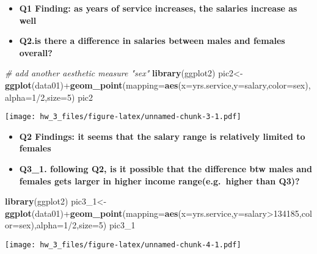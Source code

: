\documentclass[]{article}
\newenvironment{Shaded}{\begin{snugshade}}{\end{snugshade}}
\newcommand{\KeywordTok}[1]{\textcolor[rgb]{0.13,0.29,0.53}{\textbf{{#1}}}}
\newcommand{\DataTypeTok}[1]{\textcolor[rgb]{0.13,0.29,0.53}{{#1}}}
\newcommand{\DecValTok}[1]{\textcolor[rgb]{0.00,0.00,0.81}{{#1}}}
\newcommand{\CommentTok}[1]{\textcolor[rgb]{0.56,0.35,0.01}{\textit{{#1}}}}
\newcommand{\NormalTok}[1]{{#1}}
\begin{document}
\begin{itemize}
\item
  \textbf{Q1 Finding: as years of service increases, the salaries
  increase as well}
\item
  \textbf{Q2.is there a difference in salaries between males and females
  overall?}
\end{itemize}

\begin{Shaded}
\begin{Highlighting}[]
\CommentTok{# add another aesthetic measure "sex"}
\KeywordTok{library}\NormalTok{(ggplot2)}
\NormalTok{pic2<-}\KeywordTok{ggplot}\NormalTok{(data01)+}\KeywordTok{geom_point}\NormalTok{(}\DataTypeTok{mapping=}\KeywordTok{aes}\NormalTok{(}\DataTypeTok{x=}\NormalTok{yrs.service,}\DataTypeTok{y=}\NormalTok{salary,}\DataTypeTok{color=}\NormalTok{sex),}\DataTypeTok{alpha=}\DecValTok{1}\NormalTok{/}\DecValTok{2}\NormalTok{,}\DataTypeTok{size=}\DecValTok{5}\NormalTok{)}
\NormalTok{pic2}
\end{Highlighting}
\end{Shaded}

\texttt{[image: hw\_3\_files/figure-latex/unnamed-chunk-3-1.pdf]}

\begin{itemize}
\item
  \textbf{Q2 Findings: it seems that the salary range is relatively
  limited to females}
\item
  \textbf{Q3\_1. following Q2, is it possible that the difference btw
  males and females gets larger in higher income range(e.g.~higher than
  Q3)?}
\end{itemize}

\begin{Shaded}
\begin{Highlighting}[]
\KeywordTok{library}\NormalTok{(ggplot2)}
\NormalTok{pic3_1<-}\KeywordTok{ggplot}\NormalTok{(data01)+}\KeywordTok{geom_point}\NormalTok{(}\DataTypeTok{mapping=}\KeywordTok{aes}\NormalTok{(}\DataTypeTok{x=}\NormalTok{yrs.service,}\DataTypeTok{y=}\NormalTok{salary>}\DecValTok{134185}\NormalTok{,}\DataTypeTok{color=}\NormalTok{sex),}\DataTypeTok{alpha=}\DecValTok{1}\NormalTok{/}\DecValTok{2}\NormalTok{,}\DataTypeTok{size=}\DecValTok{5}\NormalTok{)}
\NormalTok{pic3_1}
\end{Highlighting}
\end{Shaded}

\texttt{[image: hw\_3\_files/figure-latex/unnamed-chunk-4-1.pdf]}
\end{document}
